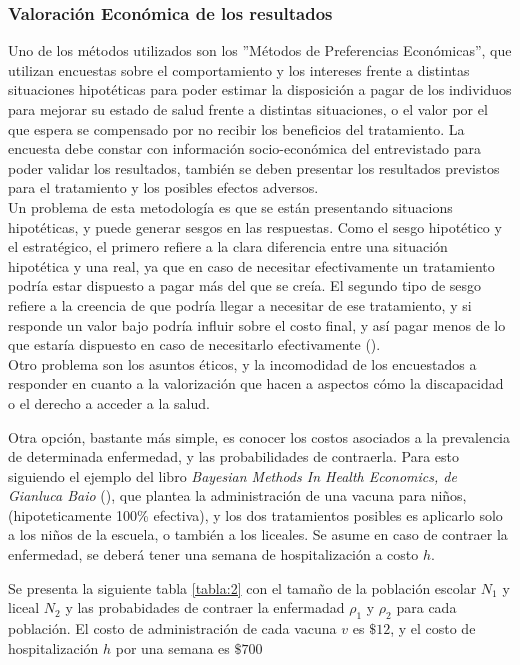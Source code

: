 \documentclass{siep}
\begin{document}
\subsubsection{Valoración Económica de los resultados}
\label{sec:VER}
Uno de los métodos utilizados son los ''Métodos de Preferencias Económicas'', que utilizan encuestas sobre el comportamiento y los intereses frente a distintas situaciones hipotéticas para poder estimar la disposición a pagar de los individuos para mejorar su estado de salud frente a distintas situaciones, o el valor por el que espera se compensado por no recibir los beneficios del tratamiento.
La encuesta debe constar con información socio-económica del entrevistado para poder validar los resultados, también se deben presentar los resultados previstos para el tratamiento y los posibles efectos adversos.\\
Un problema de esta metodología es que se están presentando situacions hipotéticas, y puede generar sesgos en las respuestas. Como el sesgo hipotético y el estratégico, el primero refiere a la clara diferencia entre una situación hipotética y una real, ya que en caso de necesitar efectivamente un tratamiento podría estar dispuesto a pagar más del que se creía. El segundo tipo de sesgo refiere a la creencia de que podría llegar a necesitar de ese tratamiento, y si responde un valor bajo podría influir sobre el costo final, y así pagar menos de lo que estaría dispuesto en caso de necesitarlo efectivamente (\cite{soto_alvarez_evaluacion_2012}).\\
Otro problema son los asuntos éticos, y la incomodidad de los encuestados a responder en cuanto a la valorización que hacen a aspectos cómo la discapacidad o el derecho a acceder a la salud.

Otra opción, bastante más simple, es conocer los costos asociados a la prevalencia de determinada enfermedad, y las probabilidades de contraerla. Para esto siguiendo el ejemplo del libro \textit{Bayesian Methods In Health Economics, de Gianluca Baio} (\cite{baio_bayesian_nodate}), que plantea la administración de una vacuna para niños, (hipoteticamente 100\% efectiva), y los dos tratamientos posibles es aplicarlo solo a los niños de la escuela, o también a los liceales. Se asume en caso de contraer la enfermedad, se deberá tener una semana de hospitalización a costo $h$.\

Se presenta la siguiente tabla \ref{tabla:2} con el tamaño de la población escolar $N_1$ y liceal $N_2$ y las probabidades de contraer la enfermadad $\rho_1$ y $\rho_2$ para  cada población. El costo de administración de cada vacuna $v$ es $\$12$, y el costo de hospitalización $h$ por una semana es $\$700$
\end{document}
